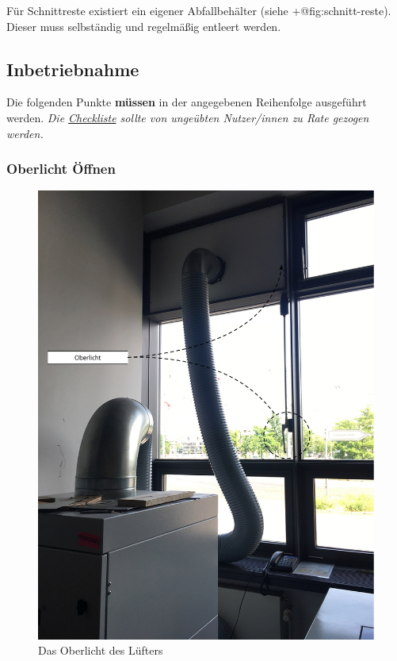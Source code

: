 \documentclass[]{article}
\begin{document}
Für Schnittreste existiert ein eigener Abfallbehälter (siehe
+@fig:schnitt-reste). Dieser muss selbständig und regelmäßig entleert
werden.

\hypertarget{inbetriebnahme}{%
\subsection{Inbetriebnahme}\label{inbetriebnahme}}

Die folgenden Punkte \textbf{müssen} in der angegebenen Reihenfolge
ausgeführt werden. \emph{Die \protect\hyperlink{checklist}{Checkliste}
sollte von ungeübten Nutzer/innen zu Rate gezogen werden.}

\hypertarget{oberlicht-uxf6ffnen}{%
\subsubsection{Oberlicht Öffnen}\label{oberlicht-uxf6ffnen}}

\begin{figure}
\hypertarget{fig:oberlicht}{%
\centering
\includegraphics{assets/images/oberlicht.jpg}
\caption{Das Oberlicht des Lüfters}\label{fig:oberlicht}
}
\end{figure}
\end{document}
